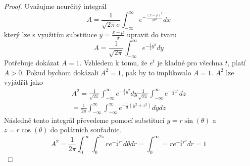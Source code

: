 \begin{proof}
Uvažujme neurčitý integrál
\begin{equation*}
A = \frac{1}{\sqrt{2 \pi} \sigma} \int_{-\infty}^{\infty} e^{-\frac{(x - \mu)^2}{2 \sigma^2}}dx
\end{equation*}
který lze s využitím substituce $y = \frac{x - \mu}{\sigma}$ upravit do tvaru
\begin{equation*}
A = \frac{1}{\sqrt{2 \pi}} \int_{-\infty}^{\infty} e^{-\frac{1}{2}y^2}dy
\end{equation*}
Potřebuje dokázat $A = 1$. Vzhledem k tomu, že $e^t$ je kladné pro všechna $t$, platí $A > 0$. Pokud bychom dokázali $A^2 = 1$, pak by to implikovalo $A = 1$. $A^2$ lze vyjádřit jako
\begin{gather*}
A^2 = \frac{1}{\sqrt{2 \pi}} \int_{-\infty}^{\infty} e^{-\frac{1}{2}y^2}dy \frac{1}{\sqrt{2 \pi}} \int_{-\infty}^{\infty} e^{-\frac{1}{2}z^2}dz\\
= \frac{1}{2 \pi} \int_{-\infty}^{\infty} \int_{-\infty}^{\infty} e^{-\frac{1}{2}(y^2 + z^2)}dydz
\end{gather*}
Následně tento integrál převedeme pomocí substitucí $y = r \sin(\theta)$ a $z = r \cos(\theta)$ do polárních souřadnic.
\begin{equation*}
A^2 = \frac{1}{2 \pi} \int_0^{\infty} \int_0^{2 \pi} r e^{-\frac{1}{2} r^2}d \theta dr = \int_0^{\infty} = r e^{-\frac{1}{2}r^2}dr = 1
\end{equation*}
\end{proof}


